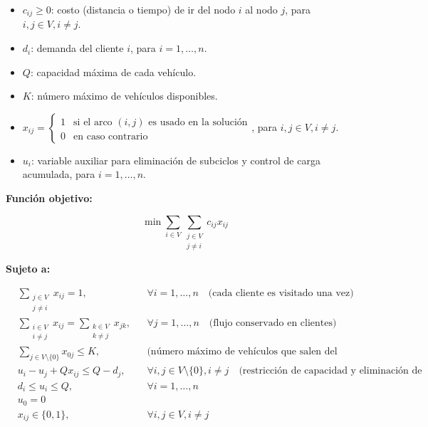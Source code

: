 \documentclass[12pt,titlepage,twoside,openright]{book}
\begin{document}
\begin{itemize}
    \item \( c_{ij} \geq 0 \): costo (distancia o tiempo) de ir del nodo \(i\) al nodo \(j\), para \(i,j \in V, i \neq j\).
    \item \( d_i \): demanda del cliente \(i\), para \(i=1,\ldots,n\).
    \item \( Q \): capacidad máxima de cada vehículo.
    \item \( K \): número máximo de vehículos disponibles.
    \item \( x_{ij} = \begin{cases} 1 & \text{si el arco } (i,j) \text{ es usado en la solución}\\ 0 & \text{en caso contrario} \end{cases} \), para \(i,j \in V, i \neq j\).
    \item \( u_i \): variable auxiliar para eliminación de subciclos y control de carga acumulada, para \(i=1,\ldots,n\).
\end{itemize}

\medskip

\textbf{Función objetivo:}

\begin{equation}
    \min \sum_{i \in V} \sum_{\substack{j \in V \\ j \neq i}} c_{ij} x_{ij}
\end{equation}

\medskip

\textbf{Sujeto a:}

\begin{align}
    & \sum_{\substack{j \in V \\ j \neq i}} x_{ij} = 1, && \forall i = 1, \ldots, n \quad \text{(cada cliente es visitado una vez)} \\
    & \sum_{\substack{i \in V \\ i \neq j}} x_{ij} = \sum_{\substack{k \in V \\ k \neq j}} x_{jk}, && \forall j = 1, \ldots, n \quad \text{(flujo conservado en clientes)} \\
    & \sum_{j \in V \setminus \{0\}} x_{0j} \leq K, && \text{(número máximo de vehículos que salen del depósito)} \\
    & u_i - u_j + Q x_{ij} \leq Q - d_j, && \forall i,j \in V \setminus \{0\}, i \neq j \quad \text{(restricción de capacidad y eliminación de subciclos)} \\
    & d_i \leq u_i \leq Q, && \forall i=1, \ldots, n \\
    & u_0 = 0 \\
    & x_{ij} \in \{0,1\}, && \forall i,j \in V, i \neq j
\end{align}
\end{document}
